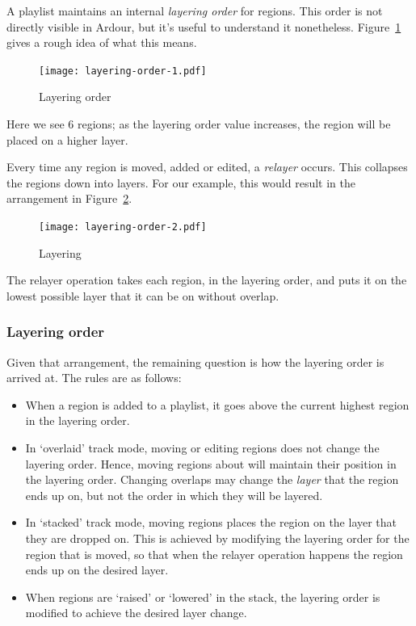 \documentclass{article}
\begin{document}
A playlist maintains an internal \emph{layering order} for regions.  This order
is not directly visible in Ardour, but it's useful to understand it
nonetheless.  Figure~\ref{fig:layering-order-1} gives a rough idea of what this
means.

\begin{figure}[ht]
\begin{center}
\texttt{[image: layering-order-1.pdf]}
\end{center}
\caption{Layering order}
\label{fig:layering-order-1}
\end{figure}

Here we see 6 regions; as the layering order value increases, the region will
be placed on a higher layer.

Every time any region is moved, added or edited, a \emph{relayer} occurs.  This
collapses the regions down into layers.  For our example, this would result in
the arrangement in Figure~\ref{fig:layering-order-2}.

\begin{figure}[ht]
\begin{center}
\texttt{[image: layering-order-2.pdf]}
\end{center}
\caption{Layering}
\label{fig:layering-order-2}
\end{figure}

The relayer operation takes each region, in the layering order, and puts it
on the lowest possible layer that it can be on without overlap.


\subsubsection{Layering order}

Given that arrangement, the remaining question is how the layering order is
arrived at.  The rules are as follows:

\begin{itemize}

\item When a region is added to a playlist, it goes above the current highest
  region in the layering order.

\item In `overlaid' track mode, moving or editing regions does not change the
  layering order.  Hence, moving regions about will maintain their position in
  the layering order.  Changing overlaps may change the \emph{layer} that the
  region ends up on, but not the order in which they will be layered.

\item In `stacked' track mode, moving regions places the region on the layer
  that they are dropped on.  This is achieved by modifying the layering order
  for the region that is moved, so that when the relayer operation happens the
  region ends up on the desired layer.

\item When regions are `raised' or `lowered' in the stack, the layering order
  is modified to achieve the desired layer change.

\end{itemize}
\end{document}
